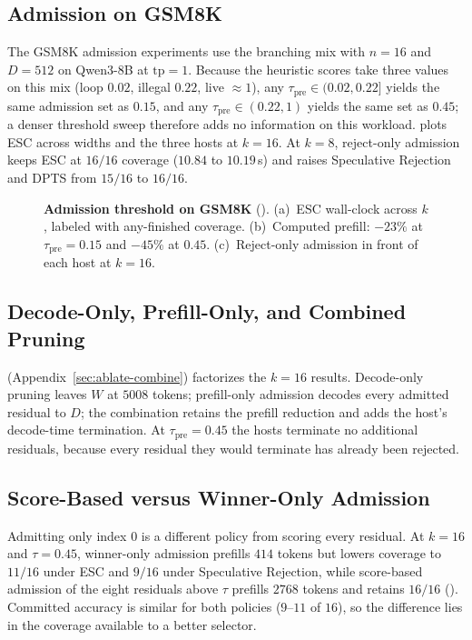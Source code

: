 \subsection{Admission on GSM8K}
\label{sec:eval-prefill}

The GSM8K admission experiments use the branching mix with $n{=}16$ and $D{=}512$ on Qwen3-8B at $\mathrm{tp}{=}1$.
Because the heuristic scores take three values on this mix (loop $0.02$, illegal $0.22$, live $\approx1$), any $\tau_{\mathrm{pre}}\in(0.02,0.22]$ yields the same admission set as $0.15$, and any $\tau_{\mathrm{pre}}\in(0.22,1)$ yields the same set as $0.45$; a denser threshold sweep therefore adds no information on this workload.
 plots ESC across widths and the three hosts at $k{=}16$.
At $k{=}8$, reject-only admission keeps ESC at $16/16$ coverage ($10.84$ to $10.19$\,s) and raises Speculative Rejection and DPTS from $15/16$ to $16/16$.

\begin{figure}[t]
\centering
\resizebox{\textwidth}{!}{}
\caption{\textbf{Admission threshold on GSM8K} ().
(a)~ESC wall-clock across $k$, labeled with any-finished coverage.
(b)~Computed prefill: $-23\%$ at $\tau_{\mathrm{pre}}{=}0.15$ and $-45\%$ at $0.45$.
(c)~Reject-only admission in front of each host at $k{=}16$.}
\label{fig:eval-admit}
\end{figure}

\subsection{Decode-Only, Prefill-Only, and Combined Pruning}
\label{sec:eval-ablate}

 (Appendix~\ref{sec:ablate-combine}) factorizes the $k{=}16$ results.
Decode-only pruning leaves $W$ at $5008$ tokens; prefill-only admission decodes every admitted residual to $D$; the combination retains the prefill reduction and adds the host's decode-time termination.
At $\tau_{\mathrm{pre}}{=}0.45$ the hosts terminate no additional residuals, because every residual they would terminate has already been rejected.

\subsection{Score-Based versus Winner-Only Admission}
\label{sec:eval-wide}

Admitting only index $0$ is a different policy from scoring every residual.
At $k{=}16$ and $\tau{=}0.45$, winner-only admission prefills $414$ tokens but lowers coverage to $11/16$ under ESC and $9/16$ under Speculative Rejection, while score-based admission of the eight residuals above $\tau$ prefills $2768$ tokens and retains $16/16$ ().
Committed accuracy is similar for both policies ($9$--$11$ of $16$), so the difference lies in the coverage available to a better selector.

